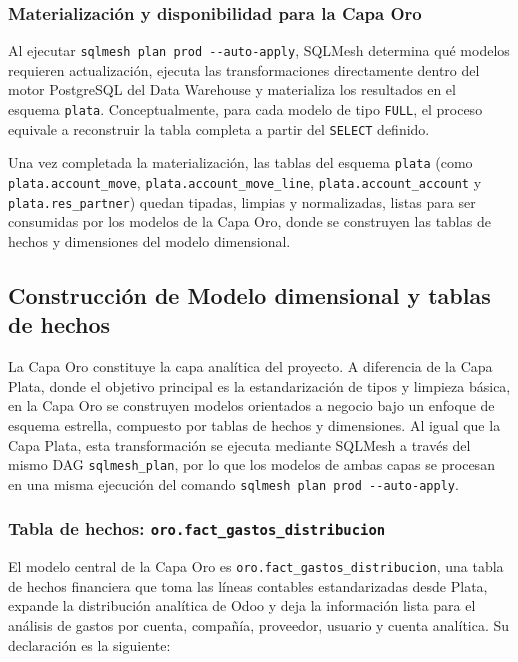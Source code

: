 \subsubsection{Materialización y disponibilidad para la Capa Oro}

Al ejecutar \texttt{sqlmesh plan prod -{}-auto-apply}, SQLMesh determina qué modelos requieren actualización, ejecuta las transformaciones directamente dentro del motor PostgreSQL del Data Warehouse y materializa los resultados en el esquema \texttt{plata}. Conceptualmente, para cada modelo de tipo \texttt{FULL}, el proceso equivale a reconstruir la tabla completa a partir del \texttt{SELECT} definido.

Una vez completada la materialización, las tablas del esquema \texttt{plata} (como \texttt{plata.account\_move}, \texttt{plata.account\_move\_line}, \texttt{plata.account\_account} y \texttt{plata.res\_partner}) quedan tipadas, limpias y normalizadas, listas para ser consumidas por los modelos de la Capa Oro, donde se construyen las tablas de hechos y dimensiones del modelo dimensional.

\subsection{Construcción de Modelo dimensional y tablas de hechos}

La Capa Oro constituye la capa analítica del proyecto. A diferencia de la Capa Plata, donde el objetivo principal es la estandarización de tipos y limpieza básica, en la Capa Oro se construyen modelos orientados a negocio bajo un enfoque de esquema estrella, compuesto por tablas de hechos y dimensiones. Al igual que la Capa Plata, esta transformación se ejecuta mediante SQLMesh a través del mismo DAG \texttt{sqlmesh\_plan}, por lo que los modelos de ambas capas se procesan en una misma ejecución del comando \texttt{sqlmesh plan prod -{}-auto-apply}.

\subsubsection{Tabla de hechos: \texttt{oro.fact\_gastos\_distribucion}}

El modelo central de la Capa Oro es \texttt{oro.fact\_gastos\_distribucion}, una tabla de hechos financiera que toma las líneas contables estandarizadas desde Plata, expande la distribución analítica de Odoo y deja la información lista para el análisis de gastos por cuenta, compañía, proveedor, usuario y cuenta analítica. Su declaración es la siguiente:


